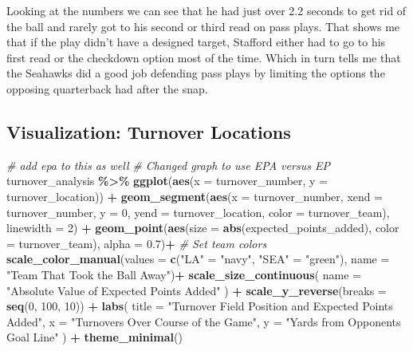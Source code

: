\documentclass[
]{article}
\newenvironment{Shaded}{\begin{snugshade}}{\end{snugshade}}
\newcommand{\AttributeTok}[1]{\textcolor[rgb]{0.13,0.29,0.53}{#1}}
\newcommand{\CommentTok}[1]{\textcolor[rgb]{0.56,0.35,0.01}{\textit{#1}}}
\newcommand{\DecValTok}[1]{\textcolor[rgb]{0.00,0.00,0.81}{#1}}
\newcommand{\FloatTok}[1]{\textcolor[rgb]{0.00,0.00,0.81}{#1}}
\newcommand{\FunctionTok}[1]{\textcolor[rgb]{0.13,0.29,0.53}{\textbf{#1}}}
\newcommand{\NormalTok}[1]{#1}
\newcommand{\OtherTok}[1]{\textcolor[rgb]{0.56,0.35,0.01}{#1}}
\newcommand{\SpecialCharTok}[1]{\textcolor[rgb]{0.81,0.36,0.00}{\textbf{#1}}}
\newcommand{\StringTok}[1]{\textcolor[rgb]{0.31,0.60,0.02}{#1}}
\begin{document}
Looking at the numbers we can see that he had just over 2.2 seconds to
get rid of the ball and rarely got to his second or third read on pass
plays. That shows me that if the play didn't have a designed target,
Stafford either had to go to his first read or the checkdown option most
of the time. Which in turn tells me that the Seahawks did a good job
defending pass plays by limiting the options the opposing quarterback
had after the snap.

\subsection{Visualization: Turnover
Locations}\label{visualization-turnover-locations}

\begin{Shaded}
\begin{Highlighting}[]
\CommentTok{\# add epa to this as well}
\CommentTok{\# Changed graph to use EPA versus EP}
\NormalTok{turnover\_analysis }\SpecialCharTok{\%\textgreater{}\%}
  \FunctionTok{ggplot}\NormalTok{(}\FunctionTok{aes}\NormalTok{(}\AttributeTok{x =}\NormalTok{ turnover\_number, }\AttributeTok{y =}\NormalTok{ turnover\_location)) }\SpecialCharTok{+}
  \FunctionTok{geom\_segment}\NormalTok{(}\FunctionTok{aes}\NormalTok{(}\AttributeTok{x =}\NormalTok{ turnover\_number, }\AttributeTok{xend =}\NormalTok{ turnover\_number,}
                   \AttributeTok{y =} \DecValTok{0}\NormalTok{, }\AttributeTok{yend =}\NormalTok{ turnover\_location,}
                   \AttributeTok{color =}\NormalTok{ turnover\_team),}
                \AttributeTok{linewidth =} \DecValTok{2}\NormalTok{) }\SpecialCharTok{+}
  \FunctionTok{geom\_point}\NormalTok{(}\FunctionTok{aes}\NormalTok{(}\AttributeTok{size =} \FunctionTok{abs}\NormalTok{(expected\_points\_added), }\AttributeTok{color =}\NormalTok{ turnover\_team), }\AttributeTok{alpha =} \FloatTok{0.7}\NormalTok{)}\SpecialCharTok{+}
  \CommentTok{\# Set team colors}
  \FunctionTok{scale\_color\_manual}\NormalTok{(}\AttributeTok{values =} \FunctionTok{c}\NormalTok{(}\StringTok{"LA"} \OtherTok{=} \StringTok{"navy"}\NormalTok{, }\StringTok{"SEA"} \OtherTok{=} \StringTok{"green"}\NormalTok{), }
                     \AttributeTok{name =} \StringTok{"Team That Took the Ball Away"}\NormalTok{)}\SpecialCharTok{+}
  \FunctionTok{scale\_size\_continuous}\NormalTok{(}
    \AttributeTok{name =} \StringTok{"Absolute Value of Expected Points Added"}
\NormalTok{  ) }\SpecialCharTok{+}
  \FunctionTok{scale\_y\_reverse}\NormalTok{(}\AttributeTok{breaks =} \FunctionTok{seq}\NormalTok{(}\DecValTok{0}\NormalTok{, }\DecValTok{100}\NormalTok{, }\DecValTok{10}\NormalTok{)) }\SpecialCharTok{+}
  \FunctionTok{labs}\NormalTok{(}
    \AttributeTok{title =} \StringTok{"Turnover Field Position and Expected Points Added"}\NormalTok{,}
    \AttributeTok{x =} \StringTok{"Turnovers Over Course of the Game"}\NormalTok{,}
    \AttributeTok{y =} \StringTok{"Yards from Opponent\textquotesingle{}s Goal Line"}
\NormalTok{  ) }\SpecialCharTok{+} \FunctionTok{theme\_minimal}\NormalTok{()}
\end{Highlighting}
\end{Shaded}
\end{document}

